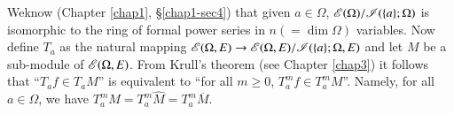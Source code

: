 \begin{remark}\label{chap2-rem1.8}
We\pageoriginale know (Chapter \ref{chap1}, \S\ref{chap1-sec4}) that given $a\in \Omega$, $\mathscr{E}(\Omega)/\mathscr{I}(\{a\};\Omega)$ is isomorphic to the ring of formal power series in $n(=\dim \Omega)$ variables. Now define $T_{a}$ as the natural mapping $\mathscr{E}(\Omega,E)\to \mathscr{E}(\Omega,E)/\mathscr{I}(\{a\};\Omega,E)$ and let $M$ be a sub-module of $\mathscr{E}(\Omega,E)$. From Krull's theorem (see Chapter \ref{chap3}) it follows that ``$T_{a}f\in T_{a}M$'' is equivalent to ``for all $m\geq 0$, $T^{m}_{a}f\in T^{m}_{a}M$''. Namely, for all $a\in \Omega$, we have $T^{m}_{a}M=T^{m}_{a}\widehat{M}=T^{m}_{a}\overline{M}$.
\end{remark}

